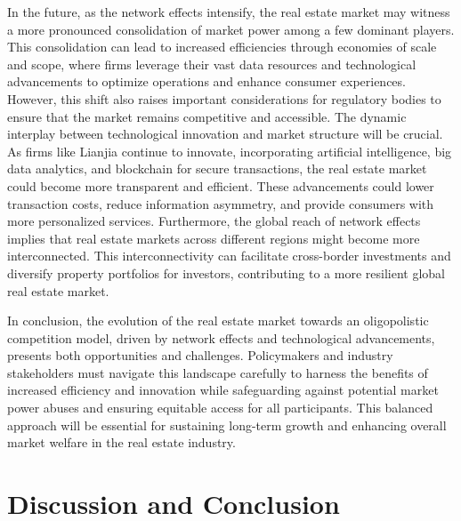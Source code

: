 \documentclass[11pt]{article}
\begin{document}
In the future, as the network effects intensify, the real estate market may witness a more pronounced consolidation of market power among a few dominant players. This consolidation can lead to increased efficiencies through economies of scale and scope, where firms leverage their vast data resources and technological advancements to optimize operations and enhance consumer experiences. However, this shift also raises important considerations for regulatory bodies to ensure that the market remains competitive and accessible. The dynamic interplay between technological innovation and market structure will be crucial. As firms like Lianjia continue to innovate, incorporating artificial intelligence, big data analytics, and blockchain for secure transactions, the real estate market could become more transparent and efficient. These advancements could lower transaction costs, reduce information asymmetry, and provide consumers with more personalized services. Furthermore, the global reach of network effects implies that real estate markets across different regions might become more interconnected. This interconnectivity can facilitate cross-border investments and diversify property portfolios for investors, contributing to a more resilient global real estate market.

In conclusion, the evolution of the real estate market towards an oligopolistic competition model, driven by network effects and technological advancements, presents both opportunities and challenges. Policymakers and industry stakeholders must navigate this landscape carefully to harness the benefits of increased efficiency and innovation while safeguarding against potential market power abuses and ensuring equitable access for all participants. This balanced approach will be essential for sustaining long-term growth and enhancing overall market welfare in the real estate industry.

\section{Discussion and Conclusion} \label{sec:conclusion}
\end{document}
